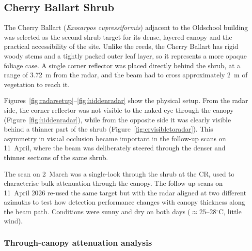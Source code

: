 
\subsection{Cherry Ballart Shrub}

The Cherry Ballart (\emph{Exocarpos cupressiformis}) adjacent to the Oldschool building was selected as the second shrub target for its dense, layered canopy and the practical accessibility of the site. Unlike the reeds, the Cherry Ballart has rigid woody stems and a tightly packed outer leaf layer, so it represents a more opaque foliage case. A single corner reflector was placed directly behind the shrub, at a range of 3.72~m from the radar, and the beam had to cross approximately 2~m of vegetation to reach it.

Figures~\ref{fig:radarsetup}--\ref{fig:hiddenradar} show the physical setup. From the radar side, the corner reflector was not visible to the naked eye through the canopy (Figure~\ref{fig:hiddenradar}), while from the opposite side it was clearly visible behind a thinner part of the shrub (Figure~\ref{fig:crvisibletoradar}). This asymmetry in visual occlusion became important in the follow-up scans on 11~April, where the beam was deliberately steered through the denser and thinner sections of the same shrub.

The scan on 2~March was a single-look through the shrub at the CR, used to characterise bulk attenuation through the canopy. The follow-up scans on 11~April 2026 re-used the same target but with the radar aligned at two different azimuths to test how detection performance changes with canopy thickness along the beam path. Conditions were sunny and dry on both days ($\approx$25--28$^\circ$C, little wind).

\subsubsection{Through-canopy attenuation analysis}

